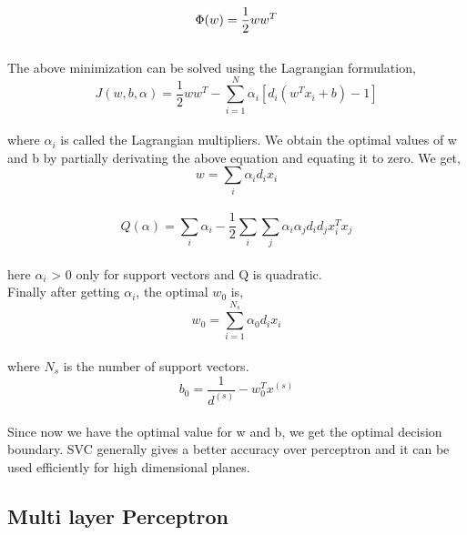 \documentclass[sigconf]{acmart}
\begin{document}
\begin{equation}\\
      \Phi(w) = \frac{1}{2}ww^T\\
\end{equation}\\
The above minimization can be solved using the Lagrangian formulation,\\
\begin{equation}
    J(w,b,\alpha) = \frac{1}{2}ww^T - \sum^{N}_{i=1}\alpha_i[ d_i(w^Tx_i +b)-1]
\end{equation}\\
where $\alpha_i$ is called the Lagrangian multipliers. We obtain the optimal values of w and b by partially derivating the above equation and equating it to zero. We get,
\begin{equation}
    w = \sum_i \alpha_id_ix_i
\end{equation}\\
\begin{equation}
    Q(\alpha) = \sum_i \alpha_i - \frac{1}{2}\sum_i\sum_j \alpha_i\alpha_jd_id_jx_i^Tx_j
\end{equation}\\
here $\alpha_i$ > 0 only for support vectors and Q is quadratic.\\
Finally after getting $\alpha_i$, the optimal $w_0$ is,
\begin{equation}
    w_0 = \sum_{i=1}^{N_s} \alpha_0d_ix_i
\end{equation}\\
where $N_s$ is the number of support vectors. 
\begin{equation}
    b_0 = \frac{1}{d^(s)} - w_0^Tx^{(s)}
\end{equation}\\
Since now we have the optimal value for w and b, we get the optimal decision boundary. SVC generally gives a better accuracy over perceptron and it can be used efficiently for high dimensional planes.\cite{Williamson2}
\subsection{Multi layer Perceptron}
\end{document}
